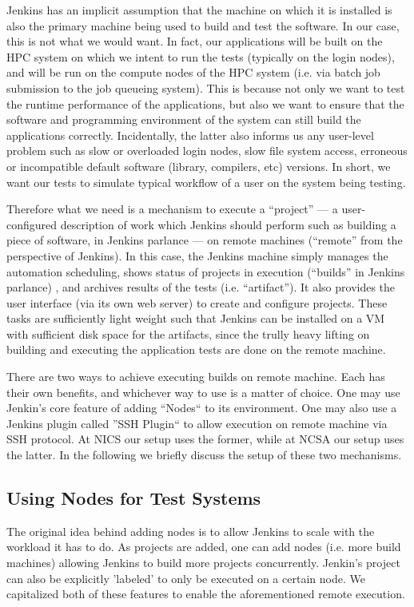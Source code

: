 \documentclass[10pt, conference, compsocconf]{IEEEtran}
\begin{document}
Jenkins has an implicit assumption that the machine on which it is installed is also the primary machine being used to build and test the software. In our case, this is not what we would want. In fact, our applications will be built on the HPC system on which we intent to run the tests (typically on the login nodes), and will be run on the compute nodes of the HPC system (i.e. via batch job submission to the job queueing system). This is because not only we want to test the runtime performance of the applications, but also we want to ensure that the software and programming environment of the system can still build the applications correctly. Incidentally, the latter also informs us any user-level problem such as slow or overloaded login nodes, slow file system access, erroneous or incompatible default software (library, compilers, etc) versions. In short, we want our tests to simulate typical workflow of a user on the system being testing.

Therefore what we need is a mechanism to execute a ``project'' --- a user-configured description of work which Jenkins should perform such as building a piece of software, in Jenkins parlance --- on remote machines (``remote'' from the perspective of Jenkins). In this case, the Jenkins machine simply manages the automation scheduling, shows status of projects in execution (``builds'' in Jenkins parlance) , and archives results of the tests (i.e. ``artifact''). It also provides the user interface (via its own web server) to create and configure projects. These tasks are sufficiently light weight such that Jenkins can be installed on a VM with sufficient disk space for the artifacts, since the trully heavy lifting on building and executing the application tests are done on the remote machine.

There are two ways to achieve executing builds on remote machine. Each has their own benefits, and whichever way to use is a matter of choice. One may use Jenkin's core feature of adding ``Nodes`` to its environment. One may also use a Jenkins plugin called ''SSH Plugin`` to allow execution on remote machine via SSH protocol. At NICS our setup uses the former, while at NCSA our setup uses the latter. In the following we briefly discuss the setup of these two mechanisms.

\subsection{Using Nodes for Test Systems}
The original idea behind adding nodes is to allow Jenkins to scale with the workload it has to do. As projects are added, one can add nodes (i.e. more build machines) allowing Jenkins to build more projects concurrently. Jenkin's project can also be explicitly 'labeled' to only be executed on a certain node. We capitalized both of these features to enable the aforementioned remote execution.
\end{document}
